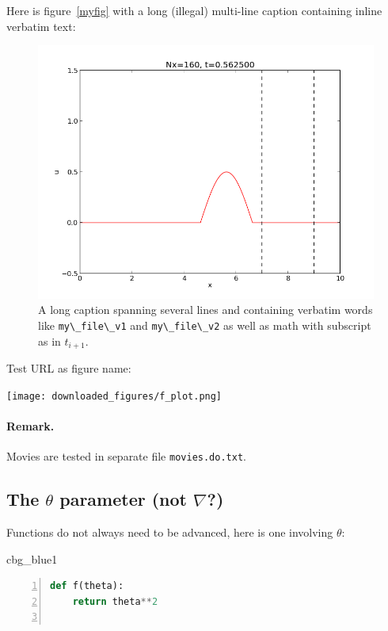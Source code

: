 \documentclass[%
oneside,                 %
final,                   %
10pt]{article}
\newenvironment{_cod_tight}[1]{
   \def\FrameCommand{\colorbox{#1}}
   \FrameRule0.6pt\MakeFramed {\FrameRestore}\vskip3mm}
   {\vskip0mm\endMakeFramed}
\newenvironment{cod}[1]{
\bgroup\rmfamily
\fboxsep=0mm\relax
\begin{_cod_tight}{#1}
\list{}{\parsep=-2mm\parskip=0mm\topsep=0pt\leftmargin=2mm
\rightmargin=2\leftmargin\leftmargin=4pt\relax}
\item\relax}
{\endlist\end{_cod_tight}\egroup}
\theoremstyle{definition}
\begin{document}
\begin{enumerate}
\vspace{6mm}
Here is figure~\vref{myfig} with a long (illegal) multi-line caption
containing inline verbatim text:
\begin{figure}
  \centering
  \includegraphics[width=0.9\linewidth]{testfigs/wave1D.png}
  \caption{
  A long caption spanning several lines and containing verbatim words like \protect \Verb!my\_file\_v1! and \protect \Verb!my\_file\_v2! as well as math with subscript as in $t_{i+1}$. \label{myfig}
  }
\end{figure}
Test URL as figure name:
\vspace{6mm}
\centerline{\texttt{[image: downloaded\_figures/f\_plot.png]}}
\vspace{6mm}
\paragraph{Remark.}
Movies are tested in separate file \texttt{movies.do.txt}.
\subsection{The $\theta$ parameter (not $\nabla$?)}
\label{decay:sec:theta}
Functions do not always need to be advanced, here is one
involving $\theta$:
\begin{cod}{cbg_blue1}\begin{lstlisting}[language=Python,style=myspeciallststyle,numbers=left,numberstyle=\tiny,stepnumber=3,numbersep=15pt,xleftmargin=1mm]
def f(theta):
    return theta**2


\end{lstlisting}
\end{cod}
\end{enumerate}
\end{document}
